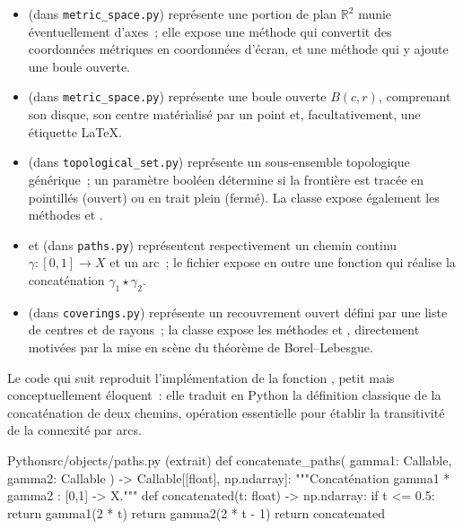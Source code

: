 \documentclass[12pt, a4paper, openany]{report}
\begin{document}
	\begin{itemize}
		\item {} (dans \texttt{metric\_space.py}) représente une portion de plan $\mathbb{R}^2$ munie éventuellement d’axes~; elle expose une méthode  qui convertit des coordonnées métriques en coordonnées d’écran, et une méthode  qui y ajoute une boule ouverte.
		\item {} (dans \texttt{metric\_space.py}) représente une boule ouverte $B(c,r)$, comprenant son disque, son centre matérialisé par un point et, facultativement, une étiquette \LaTeX.
		\item {} (dans \texttt{topological\_set.py}) représente un sous-ensemble topologique générique~; un paramètre booléen  détermine si la frontière est tracée en pointillés (ouvert) ou en trait plein (fermé). La classe expose également les méthodes  et .
		\item {} et  (dans \texttt{paths.py}) représentent respectivement un chemin continu $\gamma:[0,1]\to X$ et un arc~; le fichier expose en outre une fonction  qui réalise la concaténation $\gamma_1\star\gamma_2$.
		\item {} (dans \texttt{coverings.py}) représente un recouvrement ouvert défini par une liste de centres et de rayons~; la classe expose les méthodes  et , directement motivées par la mise en scène du théorème de Borel--Lebesgue.
	\end{itemize}

	Le code qui suit reproduit l’implémentation de la fonction , petit mais conceptuellement éloquent~: elle traduit en Python la définition classique de la concaténation de deux chemins, opération essentielle pour établir la transitivité de la connexité par arcs.

	\begin{codefile}{Python}{src/objects/paths.py (extrait)}
def concatenate_paths(
    gamma1: Callable, gamma2: Callable
) -> Callable[[float], np.ndarray]:
    """Concaténation gamma1 * gamma2 : [0,1] -> X."""
    def concatenated(t: float) -> np.ndarray:
        if t <= 0.5:
            return gamma1(2 * t)
        return gamma2(2 * t - 1)
    return concatenated
	\end{codefile}
\end{document}
